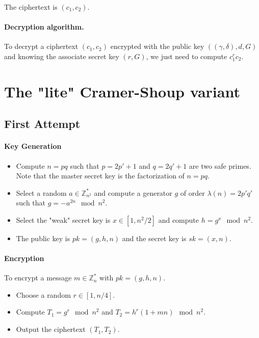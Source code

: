 \documentclass[a4paper,11pt]{article}
\begin{document}
 The ciphertext is $(c_{1}, c_{2})$.

\paragraph{Decryption algorithm.}
 To decrypt a ciphertext $(c_{1}, c_{2})$ encrypted with the public
 key $((\gamma, \delta), d, G)$ and knowing the associate secret key
 $( r, G)$, we just need to compute $c_{1}^{r}c_{2}$.

\section{The "lite" Cramer-Shoup variant}\label{sec:three}

\subsection{First Attempt}\label{sec:three:1}

\paragraph{Key Generation}
    \begin{itemize}
      \item Compute $n=pq$ such that $p=2p'+1$ and $q=2q'+1$ are two safe primes.
      Note that the master secret key is the factorization of $n = pq$.
      \item Select a random $a \in \mathbb{Z}_{n^{2}}^{*}$ and compute a generator $g$ of order $\lambda(n)=2p'q'$ such that $g=-a^{2n} \mod n^{2}$.
      \item Select the "weak" secret key is $x \in [1,n^{2}/2]$ and compute $h=g^{x} \mod n^{2}$.
      \item The public key is $pk=(g,h,n)$ and the secret key is $sk=(x,n)$.
    \end{itemize}

\paragraph{Encryption}
    To encrypt a message $m \in \mathbb{Z}_{n}^{*}$ with $pk = (g,h,n)$.
    \begin{itemize}
      \item Choose a random $r \in [1, n/4]$.
      \item Compute $T_{1}=g^{r} \mod n^{2}$ and $T_{2}=h^{r}(1+mn) \mod n^{2}$.
      \item Output the ciphertext $(T_{1}, T_{2})$.
    \end{itemize}
\end{document}
